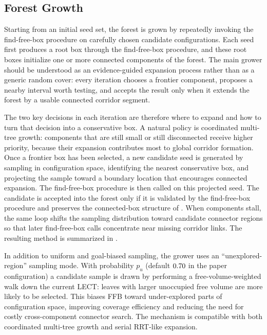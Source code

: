 \documentclass[journal]{IEEEtran}
\begin{document}
\subsection{Forest Growth}\label{sec:forest_growth}

Starting from an initial seed set, the forest is grown by repeatedly invoking
the find-free-box procedure on carefully chosen candidate configurations.
Each seed first produces a root box through the find-free-box procedure, and
these root boxes initialize one or more connected components of the forest.
The main grower should be understood as an
evidence-guided expansion process rather than as a generic random cover:
every iteration chooses a frontier component, proposes a nearby interval worth
testing, and accepts the result only when it extends the forest by a usable
connected corridor segment.

The two key decisions in each iteration are therefore where to expand and how
to turn that decision into a conservative box. A natural policy is coordinated
multi-tree growth: components that are still small or still disconnected
receive higher priority, because their expansion contributes most to global
corridor formation. Once a frontier box has been selected, a new candidate seed
is generated by sampling in configuration space, identifying the nearest
conservative box, and projecting the sample toward a boundary location that
  encourages connected expansion. The find-free-box procedure is then called on this projected seed.
  The candidate is accepted into the forest only if it is validated by the
  find-free-box procedure and preserves the connected-box structure of
  . When
components stall, the same loop shifts the sampling distribution toward
candidate connector regions so that later find-free-box calls concentrate near
missing corridor links. The resulting method is summarized in
.

In addition to uniform and goal-biased sampling, the grower uses an
``unexplored-region'' sampling mode. With probability $p_u$ (default
$0.70$ in the paper configuration) a candidate sample is drawn by
performing a free-volume-weighted walk down the current LECT: leaves with
larger unoccupied free volume are more likely to be selected. This biases FFB
toward under-explored parts of configuration space, improving coverage
efficiency and reducing the need for costly cross-component connector search. The
mechanism is compatible with both coordinated multi-tree growth and serial
RRT-like expansion.
\end{document}
